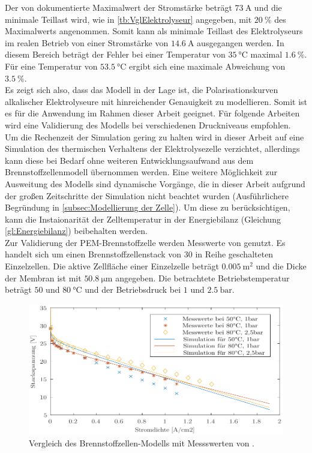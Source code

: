 Der von \citet{hammoudi_new_2012} dokumentierte Maximalwert der Stromstärke beträgt $\SI{73}{\A}$ und die minimale Teillast wird, wie in \ref{tb:VglElektrolyseur} angegeben, mit $\SI{20}{\%}$ des Maximalwerts angenommen. Somit kann als minimale Teillast des Elektrolyseurs im realen Betrieb von einer Stromstärke von $\SI{14,6}{\A}$ ausgegangen werden. In diesem Bereich beträgt der Fehler bei einer Temperatur von $\SI{35}{\degreeCelsius}$ maximal $\SI{1,6}{\%}$. Für eine Temperatur von $\SI{53,5}{\degreeCelsius}$ ergibt sich eine maximale Abweichung von $\SI{3,5}{\%}$.\\
Es zeigt sich also, dass das Modell in der Lage ist, die Polarisationskurven alkalischer Elektrolyseure mit hinreichender Genauigkeit zu modellieren. Somit ist es für die Anwendung im Rahmen dieser Arbeit geeignet. Für folgende Arbeiten wird eine Validierung des Modells bei verschiedenen Druckniveaus empfohlen.\\

Um die Rechenzeit der Simulation gering zu halten wird in dieser Arbeit auf eine Simulation des thermischen Verhaltens der Elektrolysezelle verzichtet, allerdings kann diese bei Bedarf ohne weiteren Entwicklungsaufwand aus dem Brennstoffzellenmodell übernommen werden.
Eine weitere Möglichkeit zur Ausweitung des Modells sind dynamische Vorgänge, die in dieser Arbeit aufgrund der großen Zeitschritte der Simulation nicht beachtet wurden (Ausführlichere Begründung in \ref{subsec:Modellierung der Zelle}). Um diese zu berücksichtigen, kann die Instaionarität der Zelltemperatur in der Energiebilanz (Gleichung \ref{gl:Energiebilanz}) beibehalten werden.\\

Zur Validierung der PEM-Brennstoffzelle werden Messwerte von \citet{chugh_experimental_2020} genutzt. Es handelt sich um einen Brennstoffzellenstack von 30 in Reihe geschalteten Einzelzellen. Die aktive Zellfläche einer Einzelzelle beträgt $\SI{0,005}{\m\squared}$ und die Dicke der Membran ist mit $\SI{50,8}{\micro\m}$ angegeben. Die betrachtete Betriebstemperatur beträgt $50$ und $\SI{80}{\degreeCelsius}$ und der Betriebsdruck bei $1$ und $\SI{2,5}{\bar}$.

\begin{figure}[h]
	\centering
		\includegraphics[scale=1]{Figures/ValidierungPEMFC}
		\caption{Vergleich des Brennstoffzellen-Modells mit Messswerten von \citet{chugh_experimental_2020}.}
\label{fig:ValPEMFC}	
\end{figure}

